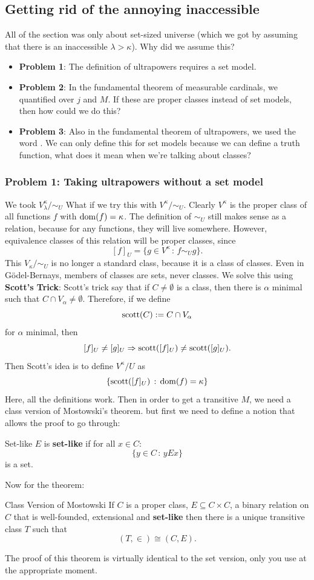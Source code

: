 \documentclass{article}
\begin{document}
\subsection{Getting rid of the annoying inaccessible}
All of the  section was only about set-sized universe (which we got by assuming that there is an inaccessible $\lambda > \kappa$). Why did we assume this? \begin{itemize}
    \item \textbf{Problem 1}: The definition of ultrapowers requires a set model.
    \item \textbf{Problem 2}: In the fundamental theorem of measurable cardinals, we quantified over $j$ and $M$. If these are proper classes instead of set models, then how could we do this?
    \item \textbf{Problem 3}: Also in the fundamental theorem of ultrapowers, we used the word . We can only define this for set models because we can define a truth function, what does it mean when we're talking about classes?
\end{itemize}
\subsubsection{Problem 1: Taking ultrapowers without a set model}
We took $V_{\lambda}^{\kappa}/ \sim_{U}$ What if we try this with $V^{\kappa}/\sim_{U}$. Clearly $V^{\kappa}$ is the proper class of all functions $f$ with $\operatorname{dom}(f) = \kappa$. The definition of $\sim_{U}$ still makes sense as a relation, because for any functions, they will live somewhere. However, equivalence classes of this relation will be proper classes, since \[ [f]_{U} = \{ g \in V^{\kappa} \, : \, f \sim_{U} g\}.\]
This $V_{\kappa}/\sim_{U}$ is no longer a standard class, because it is a class of classes. Even in G\"odel-Bernays, members of classes are sets, never classes. \gap 
We solve this using \textbf{Scott's Trick}: \gap 
    Scott's trick say that if $C \neq \emptyset$ is a class, then there is $\alpha$ minimal such that $C \cap V_{\alpha} \neq \emptyset$. \gap 
    Therefore, if we define \[ \operatorname{scott}(C) := C \cap V_{\alpha}\] for $\alpha$ minimal, then \[ [f]_{U} \neq [g]_{U} \Rightarrow \operatorname{scott}([f]_{U}) \neq \operatorname{scott}([g]_{U}).\]
    Then Scott's idea is to define $V^{\kappa}/ U$ as \[ \{ \operatorname{scott}([f]_{U}) \, : \, \operatorname{dom}(f) = \kappa \}\]
    Here, all the definitions work. 
Then in order to get a transitive $M$, we need a class version of Mostowski's theorem. but first we need to define a notion that allows the proof to go through:
\begin{fancydefine}{Set-like}
    $E$ is \textbf{set-like} if for all $x \in C$: \[ \{ y \in C \, : \, yEx\}\] is a set.
\end{fancydefine}
Now for the theorem:
 \begin{fancythm}{Class Version of Mostowski}
    If $C$ is a proper class, $E \subseteq C \times C$, a binary relation on $C$ that is well-founded, extensional and \textbf{set-like} then there is a unique transitive class $T$ such that \[ (T, \in) \cong (C, E).\]
\end{fancythm}
\proof The proof of this theorem is virtually identical to the set version, only you use  at the appropriate moment. \endproof 
\end{document}
